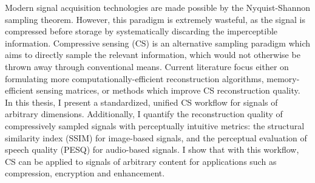 Modern signal acquisition technologies are made possible by the Nyquist-Shannon sampling theorem. However, this paradigm is extremely wasteful, as the signal is compressed before storage by systematically discarding the imperceptible information. Compressive sensing (CS) is an alternative sampling paradigm which aims to directly sample the relevant information, which would not otherwise be thrown away through conventional means. Current literature focus either on formulating more computationally-efficient reconstruction algorithms, memory-efficient sensing matrices, or methods which improve CS reconstruction quality. In this thesis, I present a standardized, unified CS workflow for signals of arbitrary dimensions. Additionally, I quantify the reconstruction quality of compressively sampled signals with perceptually intuitive metrics: the structural similarity index (SSIM) for image-based signals, and the perceptual evaluation of speech quality (PESQ) for audio-based signals. I show that with this workflow, CS can be applied to signals of arbitrary content for applications such as compression, encryption and enhancement.